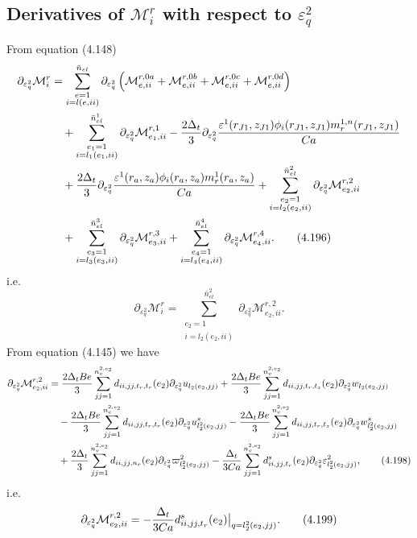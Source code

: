 \documentclass{article}
\begin{document}
\subsection{Derivatives of $\mathcal{M}_i^r$ with respect to $\varepsilon_q^2$} %
From equation (4.148)
\begin{align}
\partial_{\varepsilon_q^2}\mathcal{M}_i^r &= \sum_{\substack{e=1\\ i=l(e,ii)}}^{\bar{n}_{el}} \partial_{\varepsilon_q^2} \left( \mathcal{M}_{e,ii}^{r,0a} + \mathcal{M}_{e,ii}^{r,0b} + \mathcal{M}_{e,ii}^{r,0c} + \mathcal{M}_{e,ii}^{r,0d} \right) \nonumber\\
&\quad + \sum_{\substack{e_1=1\\ i=l_1(e_1,ii)}}^{\bar{n}_{el}^1} \partial_{\varepsilon_q^2} \mathcal{M}_{e_1,ii}^{r,1} 
- \frac{2\Delta_t}{3} \partial_{\varepsilon_q^2} \frac{\varepsilon^1(r_{J1},z_{J1}) \phi_i(r_{J1},z_{J1}) m_r^{1,n}(r_{J1},z_{J1})}{Ca} \nonumber\\
&\quad + \frac{2\Delta_t}{3} \partial_{\varepsilon_q^2} \frac{\varepsilon^1(r_a,z_a) \phi_i(r_a,z_a) m_r^{1}(r_a,z_a)}{Ca} 
+ \sum_{\substack{e_2=1\\ i=l_2(e_2,ii)}}^{\bar{n}_{el}^2} \partial_{\varepsilon_q^2} \mathcal{M}_{e_2,ii}^{r,2} \nonumber\\
&\quad + \sum_{\substack{e_3=1\\ i=l_3(e_3,ii)}}^{\bar{n}_{el}^3} \partial_{\varepsilon_q^2} \mathcal{M}_{e_3,ii}^{r,3} 
+ \sum_{\substack{e_4=1\\ i=l_4(e_4,ii)}}^{\bar{n}_{el}^4} \partial_{\varepsilon_q^2} \mathcal{M}_{e_4,ii}^{r,4}. \tag{4.196}
\end{align}
i.e.
\begin{equation}
\partial_{\varepsilon_q^2}\mathcal{M}_i^r = \sum_{\substack{e_2=1\\ i=l_2(e_2,ii)}}^{\bar{n}_{el}^2} \partial_{\varepsilon_q^2} \mathcal{M}_{e_2,ii}^{r,2}. \tag{4.197}
\end{equation}
From equation (4.145) we have
\begin{align}
\partial_{\varepsilon_q^2}\mathcal{M}_{e_2,ii}^{r,2} &= \frac{2\Delta_t Be}{3} \sum_{jj=1}^{n_v^{2,e_2}} d_{ii,jj,t_r,t_r}(e_2) \partial_{\varepsilon_q^2} u_{l_2(e_2,jj)} 
+ \frac{2\Delta_t Be}{3} \sum_{jj=1}^{n_v^{2,e_2}} d_{ii,jj,t_r,t_z}(e_2) \partial_{\varepsilon_q^2} w_{l_2(e_2,jj)} \nonumber\\
&\quad - \frac{2\Delta_t Be}{3} \sum_{jj=1}^{n_v^{2,e_2}} d_{ii,jj,t_r,t_r}(e_2) \partial_{\varepsilon_q^2} u_{l_2^2(e_2,jj)}^s 
- \frac{2\Delta_t Be}{3} \sum_{jj=1}^{n_v^{2,e_2}} d_{ii,jj,t_r,t_z}(e_2) \partial_{\varepsilon_q^2} w_{l_2^2(e_2,jj)}^s \nonumber\\
&\quad + \frac{2\Delta_t}{3} \sum_{jj=1}^{n_v^{2,e_2}} d_{ii,jj,n_r}(e_2) \partial_{\varepsilon_q^2} \varpi_{l_2^2(e_2,jj)}^2 
- \frac{\Delta_t}{3Ca} \sum_{jj=1}^{n_v^{2,e_2}} d_{ii,jj,t_r}^s(e_2) \partial_{\varepsilon_q^2} \varepsilon_{l_2^2(e_2,jj)}^2, \tag{4.198}
\end{align}
i.e.
\begin{equation}
\partial_{\varepsilon_q^2}\mathcal{M}_{e_2,ii}^{r,2} = -\frac{\Delta_t}{3Ca} d_{ii,jj,t_r}^s(e_2) \big|_{q=l_2^2(e_2,jj)}. \tag{4.199}
\end{equation}
\end{document}
